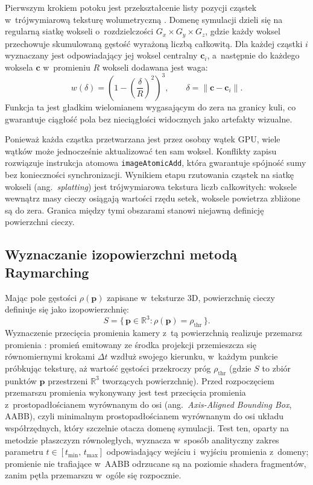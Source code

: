 Pierwszym krokiem potoku jest przekształcenie listy pozycji cząstek w~trójwymiarową
teksturę wolumetryczną \cite{kaufman2005overview}. Domenę symulacji dzieli się na
regularną siatkę wokseli o~rozdzielczości $G_x \times G_y \times G_z$, gdzie każdy
woksel przechowuje skumulowaną gęstość wyrażoną liczbą całkowitą. Dla każdej
cząstki $i$ wyznaczany jest odpowiadający jej woksel centralny $\mathbf{c}_i$,
a~następnie do każdego woksela $\mathbf{c}$ w~promieniu $R$ wokseli dodawana jest
waga:
\begin{equation}
    w(\delta) = \left(1 - \left(\frac{\delta}{R}\right)^{\!2}\right)^{\!3},
    \qquad \delta = \|\mathbf{c} - \mathbf{c}_i\|.
    \label{eq:splat_weight}
\end{equation}
Funkcja ta jest gładkim wielomianem wygasającym do zera na granicy kuli, co
gwarantuje ciągłość pola bez nieciągłości widocznych jako artefakty wizualne.

Ponieważ każda cząstka przetwarzana jest przez osobny wątek GPU, wiele wątków
może jednocześnie aktualizować ten sam woksel. Konflikty zapisu rozwiązuje
instrukcja atomowa \texttt{imageAtomicAdd}, która gwarantuje spójność sumy bez
konieczności synchronizacji. Wynikiem etapu rzutowania cząstek na siatkę wokseli (ang.~\textit{splatting}) jest trójwymiarowa tekstura
liczb całkowitych: woksele wewnątrz masy cieczy osiągają wartości rzędu setek,
woksele powietrza zbliżone są do zera. Granica między tymi obszarami stanowi
niejawną definicję powierzchni cieczy.

\subsection{Wyznaczanie izopowierzchni metodą Raymarching}

Mając pole gęstości $\rho(\mathbf{p})$ zapisane w~teksturze 3D, powierzchnię
cieczy definiuje się jako izopowierzchnię:
\begin{equation}
    S = \bigl\{\,\mathbf{p} \in \mathbb{R}^3 : \rho(\mathbf{p}) = \rho_{\mathrm{thr}}\,\bigr\}.
\end{equation}
Wyznaczenie przecięcia promienia kamery z~tą powierzchnią realizuje przemarsz promienia \cite{quilez2008raymarching, tomczak2012gpu}: promień emitowany ze
środka projekcji przemieszcza się równomiernymi krokami $\Delta t$ wzdłuż swojego
kierunku, w~każdym punkcie próbkując teksturę, aż wartość gęstości przekroczy próg $\rho_{\mathrm{thr}}$ (gdzie $S$ to zbiór punktów $\mathbf{p}$ przestrzeni $\mathbb{R}^3$ tworzących powierzchnię).
Przed rozpoczęciem przemarszu promienia wykonywany jest test przecięcia promienia
z~prostopadłościanem wyrównanym do osi (ang.~\textit{Axis-Aligned Bounding Box}, AABB), czyli
minimalnym prostopadłościanem wyrównanym do osi układu współrzędnych,
który szczelnie otacza domenę symulacji. Test ten, oparty na metodzie płaszczyzn
równoległych, wyznacza w~sposób analityczny zakres
parametru $t \in [t_{\min},\, t_{\max}]$ odpowiadający wejściu i~wyjściu promienia
z~domeny; promienie nie trafiające w~AABB odrzucane są na poziomie shadera
fragmentów, zanim pętla przemarszu w~ogóle się rozpocznie.

